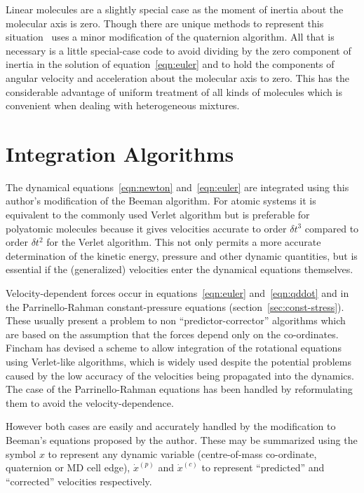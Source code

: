 Linear molecules are a slightly special case as the moment of inertia
about the molecular axis is zero.  Though there are unique methods to
represent this situation\cite[page 90]{allen:87} \moldy\ uses a minor
modification of the quaternion algorithm.  All that is necessary is a
little special-case code to avoid dividing by the zero component of
inertia in the solution of equation~\ref{eqn:euler} and to hold the
components of angular velocity and acceleration about the molecular
axis to zero.  This has the considerable advantage of uniform
treatment of all kinds of molecules which is convenient when dealing
with heterogeneous mixtures.

\section{Integration Algorithms}   %

The dynamical equations~\ref{eqn:newton} and~\ref{eqn:euler} are
integrated using this author's modification\cite{refson:85} of the
Beeman algorithm\cite{beeman:76}.  For atomic systems it is
equivalent to the commonly used Verlet algorithm\cite{verlet:67} but
is preferable for polyatomic molecules because it gives velocities
accurate to order $\delta t^3$ compared to order $\delta t^2$ for the
Verlet algorithm.  This not only permits a more accurate determination
of the kinetic energy, pressure and other dynamic quantities, but is
essential if the (generalized) velocities enter the dynamical
equations themselves.  

Velocity-dependent forces occur in equations~\ref{eqn:euler}
and~\ref{eqn:qddot} and in the Parrinello-Rahman constant-pressure
equations (section~\ref{sec:const-stress}). These usually present a
problem to non ``predictor-corrector'' algorithms which are based on
the assumption that the forces depend only on the co-ordinates.
Fincham has devised a scheme to allow integration of the rotational
equations using Verlet-like algorithms\cite{fincham:81}, which is
widely used despite the potential problems caused by the low
accuracy of the velocities being propagated into the dynamics.  The
case of the Parrinello-Rahman equations has been handled by
reformulating them to avoid the velocity-dependence\cite{dove:??}.

However both cases are easily and accurately handled by the
modification to Beeman's equations proposed by the 
author\cite{refson:85}.  These may be summarized using the symbol $x$ 
to represent any dynamic variable (centre-of-mass co-ordinate,
quaternion or MD cell edge), $\dot{x}^{(p)}$ and $\dot{x}^{(c)}$ to
represent ``predicted'' and ``corrected'' velocities respectively.

